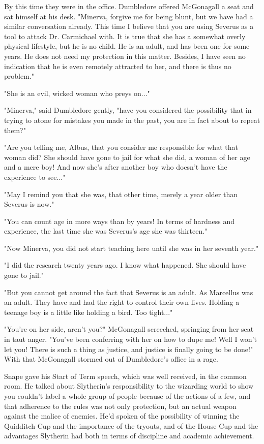 \documentclass[a4paper,11pt]{article}
\begin{document}
By this time they were in the office. Dumbledore offered McGonagall a seat and sat himself at his desk. "Minerva, forgive me for being blunt, but we have had a similar conversation already. This time I believe that you are using Severus as a tool to attack Dr. Carmichael with. It is true that she has a somewhat overly physical lifestyle, but he is no child. He is an adult, and has been one for some years. He does not need my protection in this matter. Besides, I have seen no indication that he is even remotely attracted to her, and there is thus no problem."

"She is an evil, wicked woman who preys on..."

"Minerva," said Dumbledore gently, "have you considered the possibility that in trying to atone for mistakes you made in the past, you are in fact about to repeat them?"

"Are you telling me, Albus, that you consider me responsible for what that woman did? She should have gone to jail for what she did, a woman of her age and a mere boy! And now she's after another boy who doesn't have the experience to see..."

"May I remind you that she was, that other time, merely a year older than Severus is now."

"You can count age in more ways than by years! In terms of hardness and experience, the last time she was Severus's age she was thirteen."

"Now Minerva, you did not start teaching here until she was in her seventh year."

"I did the research twenty years ago. I know what happened. She should have gone to jail."

"But you cannot get around the fact that Severus is an adult. As Marcellus was an adult. They have and had the right to control their own lives. Holding a teenage boy is a little like holding a bird. Too tight..."

"You're on her side, aren't you?" McGonagall screeched, springing from her seat in taut anger. "You've been conferring with her on how to dupe me! Well I won't let you! There is such a thing as justice, and justice is finally going to be done!" With that McGonagall stormed out of Dumbledore's office in a rage.

Snape gave his Start of Term speech, which was well received, in the common room. He talked about Slytherin's responsibility to the wizarding world to show you couldn't label a whole group of people because of the actions of a few, and that adherence to the rules was not only protection, but an actual weapon against the malice of enemies. He'd spoken of the possibility of winning the Quidditch Cup and the importance of the tryouts, and of the House Cup and the advantages Slytherin had both in terms of discipline and academic achievement.
\end{document}
